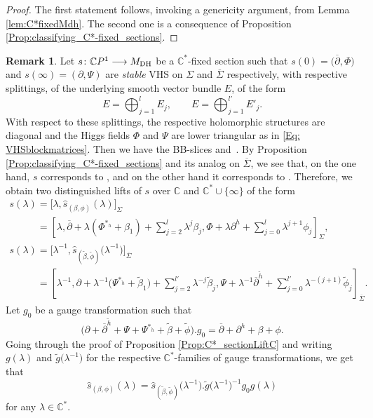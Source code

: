 \documentclass[pdftex]{sigma}
\numberwithin{equation}{section}
\theoremstyle{definition}
\newtheorem{Remark}[Theorem]{Remark}
\newcommand\C{{\mathbb C}}
\begin{document}
\begin{proof}
The first statement follows, invoking a genericity argument, from Lemma \ref{lem:C*fixedMdh}.
The second one is a consequence of Proposition \ref{Prop:classifying_C*-fixed_sections}.
\end{proof}

\begin{Remark}
Let $s\colon \C P^1 \longrightarrow \mathcal \mathcal{M}_{\mathrm{DH}}$ be a $\C^*$-fixed section such that $s(0) =
 \bigl({\overline{\partial}}, \Phi\bigr)$ and $s(\infty) = (\partial, \Psi)$ are \emph{stable} VHS on $\Sigma$ and
$\overline{\Sigma}$ respectively, with respective splittings, of the underlying smooth
vector bundle $E$, of the form
\[
E = \bigoplus_{j=1}^lE_j, \qquad E = \bigoplus_{j=1}^{l'}E'_j.
\]
With respect to these splittings, the respective holomorphic structures are diagonal and the
Higgs fields $\Phi$ and $\Psi$ are lower triangular as in \eqref{Eq: VHSblockmatrices}. Then we
have the BB-slices  and~. By Proposition
\ref{Prop:classifying_C*-fixed_sections} and its analog on $\overline{\Sigma}$, we see that, on
the one hand, $s$ corresponds to , and on
the other hand it corresponds to . Therefore, we obtain two distinguished lifts of $s$
over $\C$ and $\C^*\cup\{\infty\}$ of the form
\begin{gather*}
s(\lambda) = \big[\lambda, \widehat{s}_{(\beta,\phi)}(\lambda)\big]_\Sigma\\
\phantom{s(\lambda)}{}=
\left[\lambda, {\overline{\partial}} + \lambda(\Phi^{*_h}+\beta_1) + \sum_{j=2}^l\lambda^j\beta_j, \Phi + \lambda\partial^h + \sum_{j=0}^l\lambda^{j+1}\phi_j\right]_\Sigma,
\\
s(\lambda) = \big[\lambda^{-1}, \widehat{s}_{(\widetilde\beta,\widetilde\phi)}\bigl(\lambda^{-1}\bigr)\big]_{\overline{\Sigma}}\\
\phantom{s(\lambda)}{} = \left[\lambda^{-1}, \partial + \lambda^{-1}\bigl(\Psi^{*_{\widetilde h}}+\widetilde\beta_1\bigr)
+ \sum_{j=2}^{l'}\lambda^{-j}\widetilde\beta_j, \Psi + \lambda^{-1}\overline{\partial}^{\widetilde h} + \sum_{j=0}^{l'} \lambda^{-(j+1)}\widetilde\phi_j\right]_{\overline{\Sigma}}.
\end{gather*}
Let $g_0$ be a gauge transformation such that
\[\bigl(\partial + \overline{\partial}^{\widetilde h} + \Psi + \Psi^{*_{\widetilde h}}+
\widetilde\beta +\widetilde\phi\bigr).g_0 = {\overline{\partial}} + \partial^h + \beta+\phi.\]
Going through the proof of Proposition \ref{Prop:C*_sectionLiftC} and writing $g(\lambda)$ and
$\widetilde g\bigl(\lambda^{-1}\bigr)$ for the respective $\C^*$-families of gauge transformations, we get that
\[
\widehat{s}_{(\beta,\phi)}(\lambda)
 = \widehat{s}_{(\widetilde\beta,\widetilde\phi)}\bigl(\lambda^{-1}\bigr).\widetilde{g}\bigl(\lambda^{-1}\bigr)^{-1}g_0g(\lambda)
\]
for any $\lambda \in \C^*$.
\end{Remark}
\end{document}
